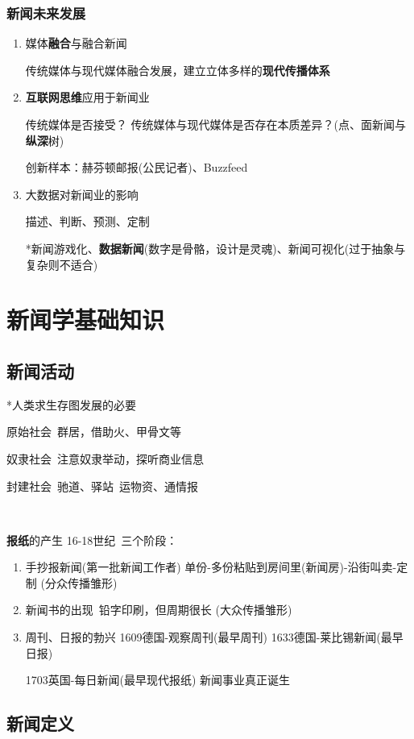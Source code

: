 \documentclass[a4paper,UTF8]{ctexart}
\begin{document}
\subsubsection{新闻未来发展}
\begin{enumerate}
	\item 媒体\textbf{融合}与融合新闻
	
	传统媒体与现代媒体融合发展，建立立体多样的\textbf{现代传播体系}
	
	\item \textbf{互联网思维}应用于新闻业
	
	\subitem 传统媒体是否接受？
	\subitem 传统媒体与现代媒体是否存在本质差异？(点、面新闻与\textbf{纵深}树)
	
	创新样本：赫芬顿邮报(公民记者)、Buzzfeed
	
	\item 大数据对新闻业的影响
	
	描述、判断、预测、定制
	
	*新闻游戏化、\textbf{数据新闻}(数字是骨骼，设计是灵魂)、新闻可视化(过于抽象与复杂则不适合)
\end{enumerate}

\section{新闻学基础知识}
\subsection{新闻活动}
*人类求生存图发展的必要

原始社会\ 群居，借助火、甲骨文等

奴隶社会\ 注意奴隶举动，探听商业信息

封建社会\ 驰道、驿站\ 运物资、通情报

~

\textbf{报纸}的产生 16-18世纪\ 三个阶段：

\begin{enumerate}
	\item 手抄报新闻(第一批新闻工作者) 单份-多份粘贴到房间里(新闻房)-沿街叫卖-定制 (分众传播雏形)
	\item 新闻书的出现\ 铅字印刷，但周期很长 (大众传播雏形)
	\item 周刊、日报的勃兴 1609德国-观察周刊(最早周刊) 1633德国-莱比锡新闻(最早日报)
	
	1703英国-每日新闻(最早现代报纸) 新闻事业真正诞生
\end{enumerate}

\subsection{新闻定义}
\end{document}
